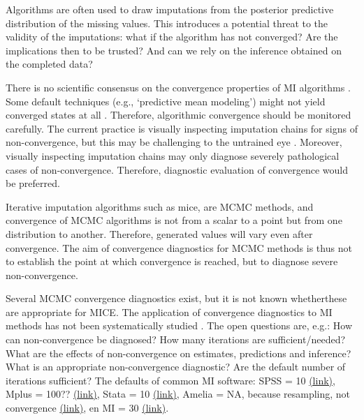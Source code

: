 \documentclass[Royal,times,sageh]{sagej}
\begin{document}
Algorithms are often used to draw imputations from the posterior
predictive distribution of the missing values. This introduces a
potential threat to the validity of the imputations: what if the
algorithm has not converged? Are the implications then to be trusted?
And can we rely on the inference obtained on the completed data?

There is no scientific consensus on the convergence properties of MI
algorithms \citep{taka17}. Some default techniques (e.g., `predictive
mean modeling') might not yield converged states at all \citep{murr18}.
Therefore, algorithmic convergence should be monitored carefully. The
current practice is visually inspecting imputation chains for signs of
non-convergence, but this may be challenging to the untrained eye
\citep[\(\S\) 6.5.2]{buur18}. Moreover, visually inspecting imputation
chains may only diagnose severely pathological cases of non-convergence.
Therefore, diagnostic evaluation of convergence would be preferred.

Iterative imputation algorithms such as mice, are MCMC methods, and
convergence of MCMC algorithms is not from a scalar to a point but from
one distribution to another. Therefore, generated values will vary even
after convergence. The aim of convergence diagnostics for MCMC methods
is thus not to establish the point at which convergence is reached, but
to diagnose severe non-convergence.

Several MCMC convergence diagnostics exist, but it is not known
whetherthese are appropriate for MICE. The application of convergence
diagnostics to MI methods has not been systematically studied
\citep{buur18}. The open questions are, e.g.: How can non-convergence be
diagnosed? How many iterations are sufficient/needed? What are the
effects of non-convergence on estimates, predictions and inference? What
is an appropriate non-convergence diagnostic? Are the default number of
iterations sufficient? The defaults of common MI software: SPSS = 10
\href{https://www.ibm.com/support/knowledgecenter/SSLVMB_24.0.0/spss/mva/syn_multiple_imputation_impute.html}{(link)},
Mplus = 100??
\href{https://pdfs.semanticscholar.org/e20e/29e008592cbfbaa567931f74cdfdb5451405.pdf?_ga=2.55354671.54033656.1584698748-527613517.1584698748}{(link)},
Stata = 10
\href{https://www.stata.com/manuals13/mi.pdf,\%20p.\%20139}{(link)},
Amelia = NA, because resampling, not convergence
\href{https://cran.r-project.org/web/packages/Amelia/Amelia.pdf}{(link)},
en MI = 30
\href{https://cran.r-project.org/web/packages/mi/mi.pdf}{(link)}.
\end{document}
